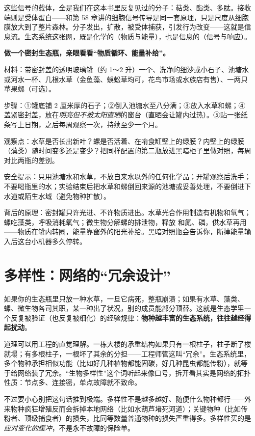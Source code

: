 这些信号的载体，全是我们在这本书里反复见过的分子：萜类、酯类、多肽。接收端则是受体蛋白——和第 58 章讲的细胞信号传导是同一套原理，只是尺度从细胞膜放大到了整片森林。分子发出，扩散，被受体捕获，引发行为改变——这就是信息流。生态系统这张网，既是化学的（物质与能量），也是信息的（信号与响应）。

\begin{shiyan}
\textbf{做一个密封生态瓶，亲眼看看“物质循环、能量补给”。}

材料：带密封盖的透明玻璃罐（约 1～2 升）一个、洗净的细沙或小石子、池塘水或河水一杯、几根水草（金鱼藻、蜈蚣草均可，花鸟市场或水族店有售）、一两只苹果螺（可选）。

步骤：①罐底铺 2 厘米厚的石子；②倒入池塘水至八分满；③放入水草和螺；④盖紧密封盖，放在\emph{明亮但不被太阳直晒}的窗台（直晒会让罐内过热）。⑤贴一张纸条写上日期，之后每周观察一次，持续至少一个月。

观察点：水草是否长出新叶？螺是否活着、在啃食缸壁上的绿膜？内壁上的绿膜（藻类）随时间变多还是变少？把同样配置的第二瓶放进黑暗柜子里做对照，每周对比两瓶的差别。

安全提示：只用池塘水和水草，不放自来水以外的任何化学品；开罐观察后洗手；不要喝瓶里的水；实验结束后把水草和螺倒回来源的池塘或妥善处理，不要倒进下水道或陌生水域（避免物种扩散）。

背后的原理：密封罐只许光进、不许物质进出。水草光合作用制造有机物和氧气；螺吃藻类，呼吸消耗氧气；微生物分解螺的排泄物，释放  和氮、磷，供水草再用——物质在罐内转圈，能量靠窗外的阳光补给。黑暗对照瓶会告诉你，断掉能量输入后这台小机器多久停转。
\end{shiyan}

\section{多样性：网络的“冗余设计”}

如果你的生态瓶里只放一种水草，一旦它病死，整瓶崩溃；如果有水草、藻类、螺、微生物各司其职，某一种出了状况，别的成员能部分顶替。这就是生态学里一个反复被验证（也反复被细化）的经验规律：\textbf{物种越丰富的生态系统，往往越经得起扰动}。

道理可以用工程的直觉理解。一栋大楼的承重结构如果只有一根柱子，柱子断了楼就塌；有多根柱子，一根坏了其余的分担——工程师管这叫“冗余”。生态系统里，多个物种承担相似功能（比如好几种植物都能固碳，好几种昆虫都能传粉），就等于给网络装了冗余。“生物多样性”这个词听起来像口号，拆开看其实是网络的拓扑性质：节点多、连接密，单点故障就不致命。

不过要小心别把这句话推到极端。多样性不是越多越好、随便什么物种都行——外来物种疯狂增殖反而会拆掉本地网络（比如水葫芦堵死河道）；关键物种（比如传粉者、顶级捕食者）的损失，比同等数量普通物种的损失严重得多。多样性买的是\emph{应对变化的缓冲}，不是永不故障的保险单。

